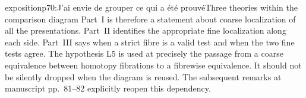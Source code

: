 \begin{dcomment}{exposition}{p70:J'ai envie de grouper ce qui a été prouvé}{Three theories within the comparison diagram}
Part~I is therefore a statement about coarse localization of all the presentations. Part~II identifies the appropriate fine localization along each side. Part~III says when a strict fibre is a valid test and when the two fine tests agree. The hypothesis L5 is used at precisely the passage from a coarse equivalence between homotopy fibrations to a fibrewise equivalence. It should not be silently dropped when the diagram is reused. The subsequent remarks at manuscript pp.~81--82 explicitly reopen this dependency.
\end{dcomment}

